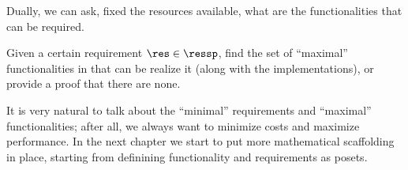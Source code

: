 Dually, we can ask, fixed the resources available, what are the functionalities that can be required.

\begin{problem}[FixReqMinFun]
    Given a certain requirement $\res\in\ressp$, find the set of ``maximal'' functionalities in that can be realize it (along with the implementations), or provide a proof that there are none.
\end{problem}


It is very natural to talk about the ``minimal'' requirements and ``maximal'' functionalities;
after all, we always want to minimize costs and maximize performance. In the next chapter
we start to put more mathematical scaffolding in place, starting from definining functionality
and requirements as posets.





